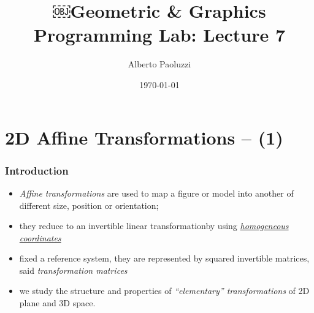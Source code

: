 \documentclass{beamer}
\title{￼Geometric \& Graphics Programming Lab: Lecture 7}
\author{Alberto Paoluzzi}
\date{\today}
\begin{document}
\frame{\titlepage}

\section[Outline]{}
\frame{\tableofcontents}


\section{2D Affine Transformations -- (1)}
\begin{frame}\frametitle{Introduction}\small

\vfill

\begin{itemize}
\vfill\item 
\emph{Affine transformations} are used to map a figure or model into another of different size, position or orientation; 

\vfill\item 
they reduce to an invertible linear transformationby using \href{http://robotics.stanford.edu/~birch/projective/node4.html}{\emph{homogeneous coordinates}}

\vfill\item 
fixed a reference system, they are represented by squared invertible matrices, said \emph{transformation matrices}

\vfill\item 
we study the structure and properties of \emph{``elementary'' transformations} of 2D plane and 3D space.
\end{itemize}

\vfill
\end{frame}
\end{document}
